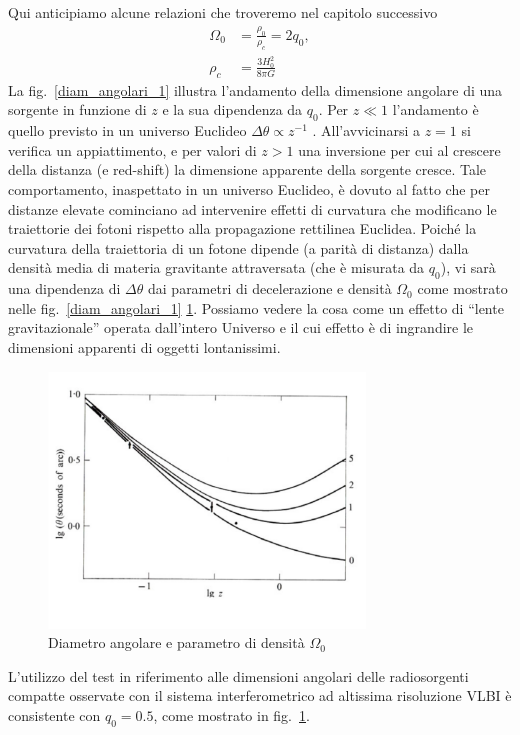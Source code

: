 Qui anticipiamo alcune relazioni che troveremo nel capitolo successivo
\begin{align}
  \Omega_0 &= \frac{\rho_0 }{\rho_c}=2 q_0, \\
  \rho_c   &= \frac{3 H_0^2}{8 \pi G}
\end{align}
La fig.~\ref{diam_angolari_1} illustra l'andamento della dimensione angolare di
una sorgente in funzione di $z$ e la sua dipendenza da $q_0$.  Per $z\ll 1$
l'andamento è quello previsto in un universo Euclideo $\Delta \theta \propto
z^{-1}$ .  All'avvicinarsi a $z=1$ si verifica un appiattimento, e per valori di
$z>1$ una inversione per cui al crescere della distanza (e red-shift) la
dimensione apparente della sorgente cresce.  Tale comportamento, inaspettato in
un universo Euclideo, è dovuto al fatto che per distanze elevate cominciano ad
intervenire effetti di curvatura che modificano le traiettorie dei fotoni
rispetto alla propagazione rettilinea Euclidea.  Poiché la curvatura della
traiettoria di un fotone dipende (a parità di distanza) dalla densità media di
materia gravitante attraversata (che è misurata da $q_0$), vi sarà una
dipendenza di $\Delta \theta$ dai parametri di decelerazione e densità
$\Omega_0$ come mostrato nelle fig.~\ref{diam_angolari_1} \ref{diam_angolari_2}.
Possiamo vedere la cosa come un effetto di ``lente gravitazionale'' operata
dall'intero Universo e il cui effetto è di ingrandire le dimensioni apparenti di
oggetti lontanissimi.
\begin{figure}
  \centering{}
  \includegraphics[width=0.75\textwidth]{figure/diametri_angolari_2.pdf}
  \caption{Diametro angolare e parametro di densità $\Omega_0$}
  \label{diam_angolari_2}
\end{figure}
L'utilizzo del test in riferimento alle dimensioni angolari delle radiosorgenti
compatte osservate con il sistema interferometrico ad altissima risoluzione VLBI
è consistente con $q_0=0.5$, come mostrato in fig.~\ref{diam_angolari_2}.

